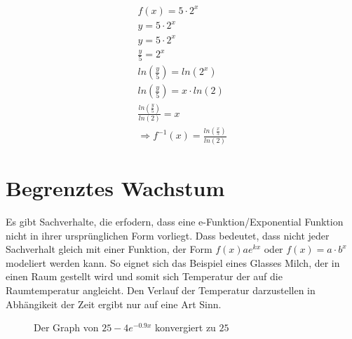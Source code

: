\begin{beispiel}
	\begin{align*}
		f(x)=5\cdot2^x\tag{$f(x)$ zu $y$ umschreiben}\\
		y=5\cdot2^x\tag{Umformen nach $x$}\\
		y=5\cdot 2^x\tag{Dividieren von $5$}\\
		\frac{y}{5}=2^x\tag{Logarithmieren}\\
		ln\left(\frac{y}{5}\right)=ln(2^x)\tag{3. Logarithmusgesetz}\\
		ln\left(\frac{y}{5}\right)=x\cdot ln(2)\tag{Dividieren $ln(2)$}\\
		\frac{ln\left(\frac{y}{5}\right)}{ln(2)}=x\\
		\Rightarrow f^{-1}(x)=\frac{ln\left(\frac{x}{5}\right)}{ln(2)}
		\end{align*}
\end{beispiel}
\section{Begrenztes Wachstum}
Es gibt Sachverhalte, die erfodern, dass eine e-Funktion/Exponential Funktion nicht in ihrer ursprünglichen Form vorliegt. Dass bedeutet, dass nicht jeder Sachverhalt gleich mit einer Funktion, der Form $f(x)ae^{kx}$ oder $f(x)=a\cdot b^x$ modeliert werden kann. So eignet sich das  Beispiel eines Glasses Milch, der in einen Raum gestellt wird und somit sich Temperatur der auf die Raumtemperatur angleicht. Den Verlauf der Temperatur darzustellen in Abhängikeit der Zeit ergibt nur auf eine Art Sinn.
\begin{figure}[h]
\centering
	\caption{Der Graph von $25-4e^{-0.9x}$ konvergiert zu $25$}
\end{figure}

